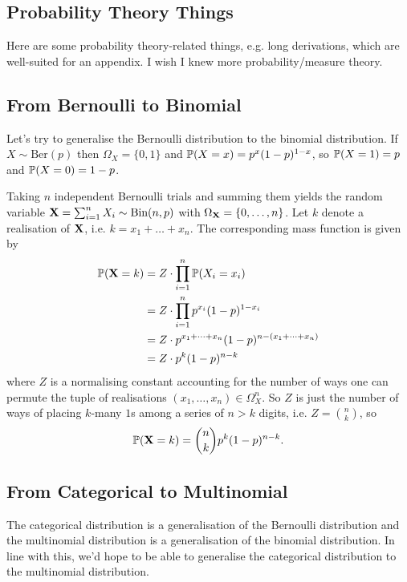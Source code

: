 \documentclass[11pt]{article}
\begin{document}
\newpage
\begin{appendices}

\section{Probability Theory Things}
Here are some probability theory-related things, e.g. long derivations, which are well-suited for an appendix. I wish I knew more probability/measure theory.

\subsection{From Bernoulli to Binomial}
Let's try to generalise the Bernoulli distribution to the binomial distribution. If $X\sim\text{Ber}(p)$ then $\Omega_X=\{0,1\}$ and $\P(X=x)=p^x(1-p)^{1-x}$, so $\P(X=1)=p$ and $\P(X=0)=1-p$.

Taking $n$ independent Bernoulli trials and summing them yields the random variable $\X=\sum_{i=1}^nX_i\sim\text{Bin}(n,p)$ with $\OX=\{0,\dots,n\}$. Let $k$ denote a realisation of $\X$, i.e. $k=x_1+\dots+x_n$. The corresponding mass function is given by
\begin{align*}
    \P(\X=k)
    &=
    Z\cdot\prod_{i=1}^n\P(X_i=x_i)\\
    &=
    Z\cdot\prod_{i=1}^np^{x_i}(1-p)^{1-x_i}\\
    &=
    Z\cdot p^{x_1+\dots+x_n}(1-p)^{n-(x_1+\dots+x_n)}\\
    &=
    Z\cdot p^k(1-p)^{n-k}
\end{align*}
where $Z$ is a normalising constant accounting for the number of ways one can permute the tuple of realisations $(x_1,\dots,x_n)\in\Omega_{X}^n$. So $Z$ is just the number of ways of placing $k$-many $1$s among a series of $n>k$ digits, i.e. $Z=\binom{n}{k}$, so
$$
\P(\X=k)
=
\binom{n}{k}p^k(1-p)^{n-k}.
$$

\subsection{From Categorical to Multinomial}
The categorical distribution is a generalisation of the Bernoulli distribution and the multinomial distribution is a generalisation of the binomial distribution. In line with this, we'd hope to be able to generalise the categorical distribution to the multinomial distribution.


\end{appendices}
\end{document}
